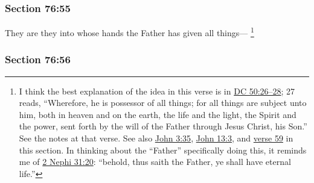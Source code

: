 
	\subsubsection{Section 76:55} %
		\label{DC76-55}

		They are they into whose hands the Father has given all things---%
			\footnote{%
				I think the best explanation of the idea in this verse is in \hyperref[DC50-26]{DC 50:26--28}; 27 reads, ``Wherefore, he is possessor of all things; for all things are subject unto him, both in heaven and on the earth, the life and the light, the Spirit and the power, sent forth by the will of the Father through Jesus Christ, his Son.'' See the notes at that verse. See also \hyperref[JOHN-3-35]{John 3:35}, \hyperref[JOHN-13-3]{John 13:3}, and \hyperref[DC76-59]{verse 59} in this section. In thinking about the ``Father'' specifically doing this, it reminds me of \hyperref[2NEPHI-31-20]{2 Nephi 31:20}: ``behold, thus saith the Father, ye shall have eternal life.'' 
				}


	\subsubsection{Section 76:56} %
		\label{DC76-56}

